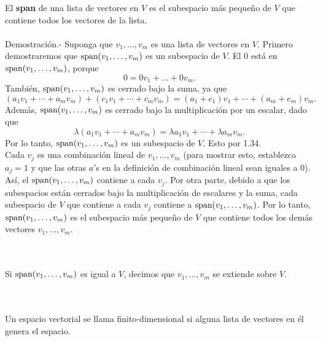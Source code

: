 \setcounter{myteo}{6}
\begin{myteo}
    El \textbf{span} de una lista de vectores en $V$ es el subespacio más pequeño de $V$ que contiene todos los vectores de la lista.\\\\
	Demostración.-\; Suponga que $v_1,\ldots,v_m$ es una lista de vectores en $V$. Primero demostraremos que $\mathop{\mbox{\normalfont span}}\nolimits(v_1,\ldots,v_m)$ es un subespacio de $V$. El $0$ está en $\mathop{\mbox{\normalfont span}}\nolimits(v_1,\ldots,v_m)$, porque
	$$0=0v_1+\ldots + 0v_m.$$
	También, $\mathop{\mbox{\normalfont span}}\nolimits(v_1,\ldots,v_m)$ es cerrado bajo la suma, ya que
	$$(a_1v_1+\cdots + a_mv_m)+(c_1v_1+\cdots+c_mv_m)=(a_1+c_1)v_1+\cdots + (a_m+c_m)v_m.$$
	Además, $\mathop{\mbox{\normalfont span}}\nolimits(v_1,\ldots,v_m)$ es cerrado bajo la multiplicación por un escalar, dado que
	$$\lambda(a_1v_1+\cdots + a_mv_m)=\lambda a_1v_1+\cdots + \lambda a_mv_m.$$
	Por lo tanto, $\mathop{\mbox{\normalfont span}}\nolimits(v_1,\ldots, v_m)$ es un subespacio de $V$. Esto por 1.34.\\

	Cada $v_j$ es una combinación lineal de $v_1,\ldots,v_m$  (para mostrar esto, establezca $a_j=1$ y que las otras $a'$s en la definición de combinación lineal sean iguales a $0$). Así, el $\mathop{\mbox{\normalfont span}}\nolimits(v_1,\ldots,v_m)$ contiene a cada $v_j$. Por otra parte, debido a que los subespacios están cerrados bajo la multiplicación de escalares y la suma, cada subespacio de $V$ que contiene a cada $v_j$ contiene a $\mathop{\mbox{\normalfont span}}\nolimits(v_1,\ldots,v_m)$. Por lo tanto, $\mathop{\mbox{\normalfont span}}\nolimits(v_1,\ldots,v_m)$ es el subespacio más pequeño de $V$ que contiene todos los demás vectores $v_1,\ldots,v_m$.
\end{myteo}

\begin{mydef}[Spans]\,\\\\
    Si $\mathop{\mbox{\normalfont span}}\nolimits(v_1,\ldots,v_m)$ es igual a $V$, decimos que $v_1,\ldots, v_m$ se extiende sobre $V$.
\end{mydef}

\setcounter{mydef}{9}
\begin{mydef}\,\\\\
    Un espacio vectorial se llama finito-dimensional si alguna lista de vectores en él genera el espacio.
\end{mydef}

